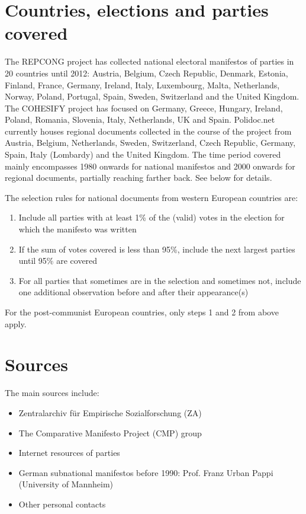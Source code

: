 \documentclass[a4paper, 12pt]{article}
\begin{document}
\clearpage

\section{Countries, elections and parties covered}
The REPCONG project has collected national electoral manifestos of parties in 20 countries until 2012: Austria, Belgium, Czech Republic, Denmark, Estonia, Finland, France, Germany, Ireland, Italy, Luxembourg, Malta, Netherlands, Norway, Poland, Portugal, Spain, Sweden, Switzerland and the United Kingdom. 
The COHESIFY project has focused on Germany, Greece, Hungary, Ireland, Poland, Romania, Slovenia, Italy, Netherlands, UK and Spain. Polidoc.net currently houses regional documents collected in the course of the project from Austria, Belgium, Netherlands, Sweden, Switzerland, Czech Republic, Germany, Spain, Italy (Lombardy) and the United Kingdom. 
The time period covered mainly encompasses 1980 onwards for national manifestos and 2000 onwards for regional documents, partially reaching farther back. See below for details. 

The selection rules for national documents from western European countries are: 
\begin{enumerate}
\item 	Include all parties with at least 1\% of the (valid) votes in the election for which the manifesto was written
\item 	If the sum of votes covered is less than 95\%, include the next largest parties until 95\% are covered
\item 	For all parties that sometimes are in the selection and sometimes not, include one additional observation before and after their appearance(s)
\end{enumerate}
For the post-communist European countries, only steps 1 and 2 from above apply.


\section{Sources}
The main sources include: 
\begin{itemize}
\item Zentralarchiv für Empirische Sozialforschung (ZA)
\item The Comparative Manifesto Project (CMP) group
\item Internet resources of parties 
\item German subnational manifestos before 1990: Prof. Franz Urban Pappi (University of Mannheim)
\item Other personal contacts
\end{itemize}
\end{document}
